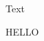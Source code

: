 \documentclass{scrartcl}
\let\myshipout=\shipout
\begin{document}
  \let\shipout=\myshipout

  Text
  \begin{preview}HELLO\end{preview}
\end{document}
